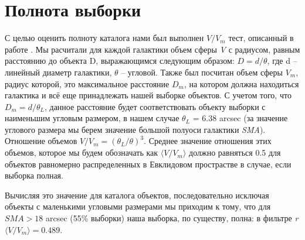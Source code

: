 \section{Полнота выборки}
С целью оценить полноту каталога нами был выполнен $V/V_m$ тест, описанный в работе \citep{1979ApJ...231..680T}. Мы расчитали для каждой галактики объем сферы \textit{V} с радиусом, равным расстоянию до объекта D, выражающимся следующим образом: $D = d/\theta$, где d -- линейный диаметр галактики, $\theta$ -- угловой. Также был посчитан объем сферы $V_m$, радиус которой, это максимальное расстояние $D_m$, на котором должна находиться галактика и всё еще принадлежать нашей выборке объектов. С учетом того, что $D_m = d/\theta_L$, данное расстояние будет соответствовать объекту выборки с наименьшим угловым размером, в нашем случае $\theta_L$ = 6.38 arcsec (за значение углового размера мы берем значение большой полуоси галактики \textit{SMA}). 
Отношение объемов $V/V_m =  (\theta_L/\theta)^3$. Среднее значение отношения этих объемов, которое мы будем обозначать как $\langle V/V_m \rangle$ должно равняться 0.5 для объектов равномерно распределенных в Евклидовом прострастве в случае, если выборка полная. 

Вычисляя это значение для каталога объектов, последовательно исключая объекты с маленькими угловыми размерами мы приходим к тому, что для $SMA>18$ arcsec (55$\%$ выборки) наша выборка, по существу, полна: в фильтре \textit{r} $\langle V/V_m \rangle = 0.489$.
